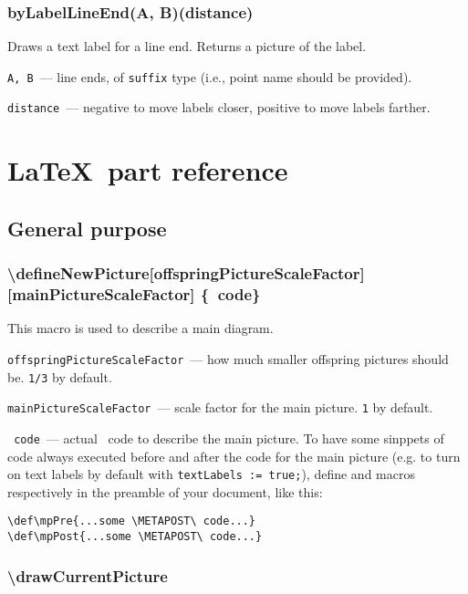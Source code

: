 \subsubsection{byLabelLineEnd(A, B)(distance)}\label{byLabelLineEnd}
	
	Draws a text label for a line end. Returns a picture of the label.
	
	\texttt{A, B}~— line ends, of \texttt{suffix} type (i.e., point name should be provided).
	
	\texttt{distance}~— negative to move labels closer, positive to move labels farther.


\section{\LaTeX\ part reference}

\subsection{General purpose}

\subsubsection{\textbackslash defineNewPicture[offspringPictureScaleFactor] [mainPictureScaleFactor] \{\METAPOST\ code\}}\label{defineNewPicture}

	This macro is used to describe a main diagram.

	\texttt{offspringPictureScaleFactor}~— how much smaller offspring pictures should be. \texttt{1/3} by default.
	
	\texttt{mainPictureScaleFactor}~— scale factor for the main picture. \texttt{1} by default.
	
	\texttt{\METAPOST\ code}~— actual \METAPOST\ code to describe the main picture. To have some sinppets of code always executed before and after the code for the main picture (e.g. to turn on text labels by default with \texttt{textLabels := true;}), define  and  macros respectively in the preamble of your document, like this:
	
\begin{lstlisting}
\def\mpPre{...some \METAPOST\ code...}
\def\mpPost{...some \METAPOST\ code...}
\end{lstlisting}


\subsubsection{\textbackslash drawCurrentPicture}
	
